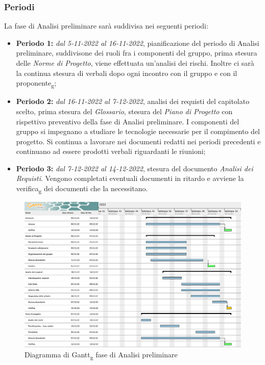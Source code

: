 \subsubsection{Periodi}
La fase di Analisi preliminare sarà suddivisa nei seguenti periodi:
\begin{itemize}
\item \textbf{Periodo 1:} \textit{dal 5-11-2022 al 16-11-2022},  pianificazione del periodo di Analisi preliminare,  suddivisone dei ruoli fra i componenti del gruppo,  prima stesura delle \textit{Norme di Progetto}, viene effettuata un'analisi dei rischi.  Inoltre ci sarà la continua stesura di verbali dopo ogni incontro con il gruppo e con il proponente\textsubscript{g};
\item \textbf{Periodo 2:} \textit{dal 16-11-2022 al 7-12-2022},  analisi dei requisti del capitolato scelto,  prima stesura del \textit{Glossario}, stesura del \textit{Piano di Progetto} con rispettivo preventivo della fase di Analisi preliminare.  I componenti del gruppo si impegnano a studiare le tecnologie necessarie per il compimento del progetto. Si continua a lavorare nei documenti redatti nei periodi precedenti e continuano ad essere prodotti verbali riguardanti le riunioni;
\item \textbf{Periodo 3: } \textit{dal 7-12-2022 al 14-12-2022}, stesura del documento \textit{Analisi dei Requisti}. Vengono completati eventuali documenti in ritardo e avviene la verifica\textsubscript{g} dei documenti che la necessitano.
\end{itemize}

\begin{figure}[H]
    \centering
    \includegraphics[scale=0.38]{image/analisi_preliminare_gantt.png}
    \caption{Diagramma di Gantt\textsubscript{g} fase di Analisi preliminare}
\end{figure}
\pagebreak

